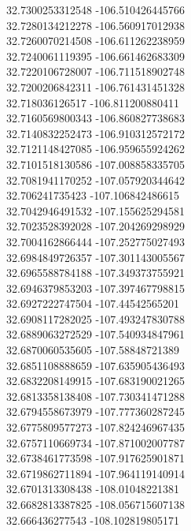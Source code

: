 {32.7300253312548	-106.510426445766\\
32.7280134212278	-106.560917012938\\
32.7260070214508	-106.611262238959\\
32.7240061119395	-106.661462683309\\
32.7220106728007	-106.711518902748\\
32.7200206842311	-106.761431451328\\
32.718036126517	-106.811200880411\\
32.7160569800343	-106.860827738683\\
32.7140832252473	-106.910312572172\\
32.7121148427085	-106.959655924262\\
32.7101518130586	-107.008858335705\\
32.7081941170252	-107.057920344642\\
32.706241735423	-107.106842486615\\
32.7042946491532	-107.155625294581\\
32.7023528392028	-107.204269298929\\
32.7004162866444	-107.252775027493\\
32.6984849726357	-107.301143005567\\
32.6965588784188	-107.349373755921\\
32.6946379853203	-107.397467798815\\
32.6927222747504	-107.44542565201\\
32.6908117282025	-107.493247830788\\
32.6889063272529	-107.540934847961\\
32.6870060535605	-107.58848721389\\
32.6851108888659	-107.635905436493\\
32.6832208149915	-107.683190021265\\
32.6813358138408	-107.730341471288\\
32.6794558673979	-107.777360287245\\
32.6775809577273	-107.824246967435\\
32.6757110669734	-107.871002007787\\
32.6738461773598	-107.917625901871\\
32.6719862711894	-107.964119140914\\
32.6701313308438	-108.01048221381\\
32.6682813387825	-108.056715607138\\
32.666436277543	-108.102819805171\\
}
